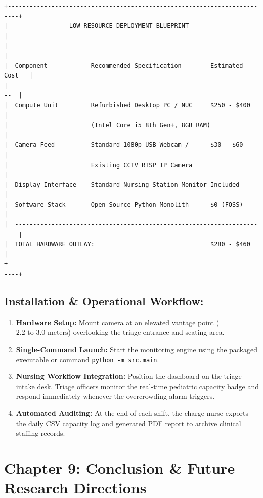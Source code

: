 \begin{verbatim}
+-------------------------------------------------------------------------+
|                 LOW-RESOURCE DEPLOYMENT BLUEPRINT                       |
|                                                                         |
|  Component            Recommended Specification        Estimated Cost   |
|  ---------------------------------------------------------------------  |
|  Compute Unit         Refurbished Desktop PC / NUC     $250 - $400      |
|                       (Intel Core i5 8th Gen+, 8GB RAM)                 |
|  Camera Feed          Standard 1080p USB Webcam /      $30 - $60        |
|                       Existing CCTV RTSP IP Camera                      |
|  Display Interface    Standard Nursing Station Monitor Included         |
|  Software Stack       Open-Source Python Monolith      $0 (FOSS)        |
|  ---------------------------------------------------------------------  |
|  TOTAL HARDWARE OUTLAY:                                $280 - $460      |
+-------------------------------------------------------------------------+
\end{verbatim}

\subsection{Installation \& Operational
Workflow:}\label{installation-operational-workflow}

\begin{enumerate}
\def\labelenumi{\arabic{enumi}.}
\tightlist
\item
  \textbf{Hardware Setup:} Mount camera at an elevated vantage point
  (\(2.2\text{ to }3.0\text{ meters}\)) overlooking the triage entrance
  and seating area.
\item
  \textbf{Single-Command Launch:} Start the monitoring engine using the
  packaged executable or command \texttt{python\ -m\ src.main}.
\item
  \textbf{Nursing Workflow Integration:} Position the dashboard on the
  triage intake desk. Triage officers monitor the real-time pediatric
  capacity badge and respond immediately whenever the overcrowding alarm
  triggers.
\item
  \textbf{Automated Auditing:} At the end of each shift, the charge
  nurse exports the daily CSV capacity log and generated PDF report to
  archive clinical staffing records.
\end{enumerate}

\section{Chapter 9: Conclusion \& Future Research
Directions}\label{chapter-9-conclusion-future-research-directions}

